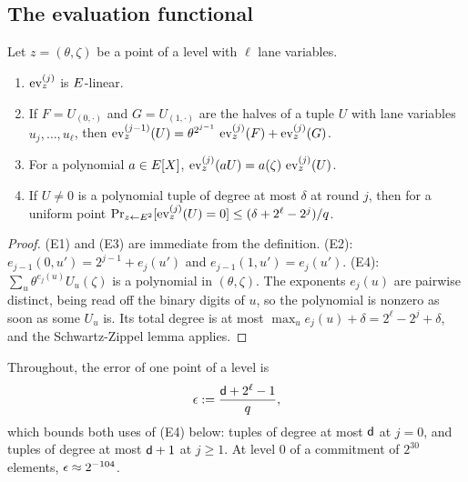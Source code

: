 \subsection{The evaluation functional}\label{sec:E}

\begin{lemma}\label{lem:E}
Let $z=(\theta,\zeta)$ be a point of a level with $\ell$ lane variables.
\begin{enumerate}[itemsep=1pt,topsep=2pt,label=\textnormal{(E\arabic*)}]
\item $\operatorname{ev}^{(j)}_z$ is $E$-linear.
\item If $F=U_{(0,\cdot)}$ and $G=U_{(1,\cdot)}$ are the halves of a tuple $U$ with lane variables $u_j,\dots,u_\ell$, then $\operatorname{ev}^{(j-1)}_z(U)=\theta^{2^{j-1}}\,\operatorname{ev}^{(j)}_z(F)+\operatorname{ev}^{(j)}_z(G)$.
\item For a polynomial $a\in E[X]$, $\operatorname{ev}^{(j)}_z(aU)=a(\zeta)\,\operatorname{ev}^{(j)}_z(U)$.
\item If $U\ne0$ is a polynomial tuple of degree at most $\delta$ at round $j$, then for a uniform point $\Pr_{z\leftarrow E^2}[\operatorname{ev}^{(j)}_z(U)=0]\le(\delta+2^\ell-2^j)/q$.
\end{enumerate}
\end{lemma}
\begin{proof}
(E1) and (E3) are immediate from the definition. (E2): $e_{j-1}(0,u')=2^{j-1}+e_j(u')$ and $e_{j-1}(1,u')=e_j(u')$. (E4): $\sum_u\theta^{e_j(u)}U_u(\zeta)$ is a polynomial in $(\theta,\zeta)$. The exponents $e_j(u)$ are pairwise distinct, being read off the binary digits of $u$, so the polynomial is nonzero as soon as some $U_u$ is. Its total degree is at most $\max_ue_j(u)+\delta=2^\ell-2^j+\delta$, and the Schwartz-Zippel lemma applies.
\end{proof}

Throughout, the error of one point of a level is
\begin{equation}\label{eq:eps}
\epsilon:=\frac{\mathsf{d}+2^\ell-1}{q},
\end{equation}
which bounds both uses of (E4) below: tuples of degree at most $\mathsf{d}$ at $j=0$, and tuples of degree at most $\mathsf{d}+1$ at $j\ge1$. At level $0$ of a commitment of $2^{30}$ elements, $\epsilon\approx2^{-104}$.

